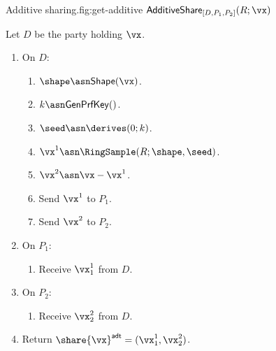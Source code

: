 \begin{Boxfig}{Additive sharing.}{fig:get-additive}
  {$\mathsf{AdditiveShare}_{[D, P_1, P_2]}(R; \vx)$}

  Let $D$ be the party holding $\vx$.

  \begin{enumerate}
    \item On $D$:
  \begin{enumerate}
    \item $\shape \asn \mathsf{Shape}(\vx)$.
    \item $k \asn \mathsf{GenPrfKey}()$.
    \item $\seed \asn \derives(0; k)$.
    \item $\vx^1 \asn \RingSample(R; \shape, \seed)$.
    \item $\vx^2 \asn \vx - \vx^1$.
    \item Send $\vx^1$ to $P_1$.
    \item Send $\vx^2$ to $P_2$.
  \end{enumerate}
  \item On $P_1$:
  \begin{enumerate}
      \item Receive $\vx^1_1$ from $D$.
  \end{enumerate}
  \item On $P_2$:
  \begin{enumerate}
      \item Receive $\vx^2_2$ from $D$.
  \end{enumerate}
  \item Return $\share{\vx}^{\mathsf{adt}} = (\vx^1_1, \vx^2_2)$.
\end{enumerate}
\end{Boxfig}

